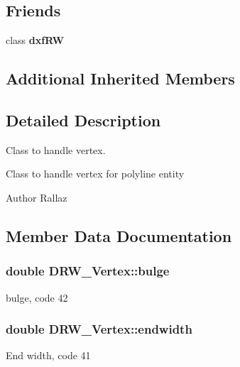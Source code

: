 \subsection*{Friends}
\begin{DoxyCompactItemize}
\item 
\hypertarget{class_d_r_w___vertex_a7f080e77e5112f8364c61b97387f8ee2}{}class {\bfseries dxf\+R\+W}\label{class_d_r_w___vertex_a7f080e77e5112f8364c61b97387f8ee2}

\end{DoxyCompactItemize}
\subsection*{Additional Inherited Members}


\subsection{Detailed Description}
Class to handle vertex. 

Class to handle vertex for polyline entity \begin{DoxyAuthor}{Author}
Rallaz 
\end{DoxyAuthor}


\subsection{Member Data Documentation}
\hypertarget{class_d_r_w___vertex_ace756c96a4ff61eb15e7e1327d7fc56d}{}
\subsubsection[{bulge}]{\setlength{\rightskip}{0pt plus 5cm}double D\+R\+W\+\_\+\+Vertex\+::bulge}\label{class_d_r_w___vertex_ace756c96a4ff61eb15e7e1327d7fc56d}
bulge, code 42 \hypertarget{class_d_r_w___vertex_a707f8fca7c9df740d9a13b1328c05d06}{}
\subsubsection[{endwidth}]{\setlength{\rightskip}{0pt plus 5cm}double D\+R\+W\+\_\+\+Vertex\+::endwidth}\label{class_d_r_w___vertex_a707f8fca7c9df740d9a13b1328c05d06}
End width, code 41 \hypertarget{class_d_r_w___vertex_a662134a0aaac672cbb37c741e872ce3a}{}
